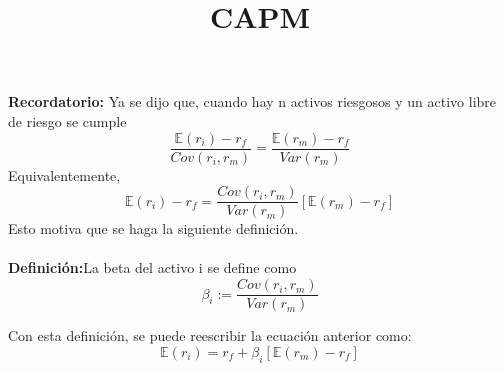 \documentclass[12pts]{extarticle}
\author{}
\date{}
\title{CAPM}
\begin{document}
\maketitle 
\textbf{Recordatorio:} Ya se dijo que, cuando hay n activos riesgosos y un activo libre de riesgo se cumple 
$$\frac{\mathbb{E}(r_i)-r_f}{Cov(r_i, r_m)} =\frac{\mathbb{E}(r_m)-r_f}{Var(r_m)}$$
Equivalentemente, 
$$\mathbb{E}(r_i)-r_f = \frac{Cov(r_i, r_m)}{Var(r_m)}[\mathbb{E}(r_m)-r_f]$$
Esto motiva que se haga la siguiente definición.\\ \\
\textbf{Definición:}La beta del activo i se define como $$ \beta_i := \frac{Cov(r_i, r_m)}{Var(r_m)}$$

Con esta definición, se puede reescribir la ecuación anterior como: 
$$ \mathbb{E}(r_i)=r_f +\beta_i [\mathbb{E}(r_m)-r_f]$$
\end{document}
